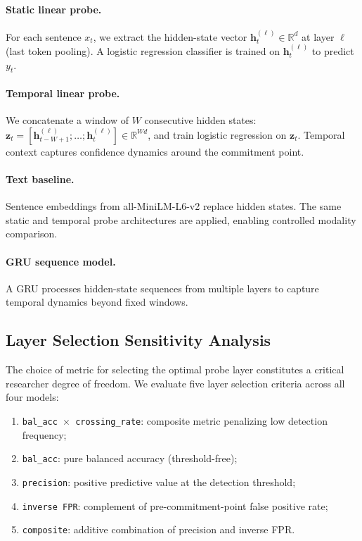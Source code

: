 \documentclass[11pt,a4paper]{article}
\begin{document}
\paragraph{Static linear probe.}
For each sentence $x_t$, we extract the hidden-state vector $\mathbf{h}_t^{(\ell)} \in \mathbb{R}^d$ at layer $\ell$ (last token pooling).
A logistic regression classifier is trained on $\mathbf{h}_t^{(\ell)}$ to predict $y_t$.

\paragraph{Temporal linear probe.}
We concatenate a window of $W$ consecutive hidden states: $\mathbf{z}_t = [\mathbf{h}_{t-W+1}^{(\ell)}; \ldots; \mathbf{h}_t^{(\ell)}] \in \mathbb{R}^{Wd}$, and train logistic regression on $\mathbf{z}_t$.
Temporal context captures confidence dynamics around the commitment point.

\paragraph{Text baseline.}
Sentence embeddings from all-MiniLM-L6-v2 replace hidden states.
The same static and temporal probe architectures are applied, enabling controlled modality comparison.

\paragraph{GRU sequence model.}
A GRU processes hidden-state sequences from multiple layers to capture temporal dynamics beyond fixed windows.

\subsection{Layer Selection Sensitivity Analysis}
\label{sec:layer_selection}

The choice of metric for selecting the optimal probe layer constitutes a critical researcher degree of freedom.
We evaluate five layer selection criteria across all four models:

\begin{enumerate}[nosep,leftmargin=*]
\item \texttt{bal\_acc $\times$ crossing\_rate}: composite metric penalizing low detection frequency;
\item \texttt{bal\_acc}: pure balanced accuracy (threshold-free);
\item \texttt{precision}: positive predictive value at the detection threshold;
\item \texttt{inverse FPR}: complement of pre-commitment-point false positive rate;
\item \texttt{composite}: additive combination of precision and inverse FPR.
\end{enumerate}
\end{document}
